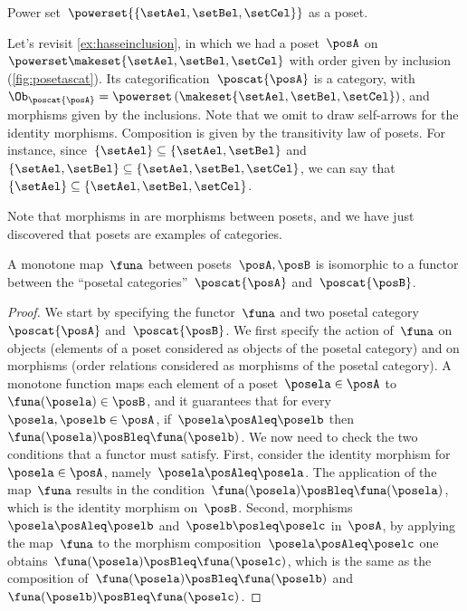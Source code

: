 \begin{marginfigure}
	\centering
	\caption{Power set~$\powerset{\{\setAel,\setBel,\setCel\}}$ as a poset. \label{fig:posetascat}}
\end{marginfigure}

\begin{example}
	Let's revisit \cref{ex:hasseinclusion}, in which we had a poset~$\posA$ on $\powerset \makeset{\setAel,\setBel,\setCel}$ with order given by inclusion (\cref{fig:posetascat}).
	Its categorification~$\poscat{\posA}$ is a category, with $\Ob_{\poscat{\posA}}=\powerset\left(\makeset{\setAel,\setBel,\setCel}\right)$, and morphisms given by the inclusions.
	Note that we omit to draw self-arrows for the identity morphisms.
	Composition is given by the transitivity law of posets.
	For instance, since~$\{\setAel\}\subseteq \{\setAel,\setBel\}$ and~$\{\setAel,\setBel\} \subseteq \{\setAel,\setBel,\setCel\}$, we can say that~$\{\setAel\}\subseteq \{\setAel,\setBel,\setCel\}$.
\end{example}



Note that morphisms in \Pos are morphisms between posets, and we have just discovered that posets are examples of categories.
\begin{lemma}
	\label{lem:posetfunctor}
	A monotone map~$\funa$ between posets~$\posA,\posB$ is isomorphic to a functor between the ``posetal categories''~$\poscat{\posA}$ and~$\poscat{\posB}$.
\end{lemma}
\begin{proof}
	We start by specifying the functor~$\funa$ and two posetal category~$\poscat{\posA}$ and~$\poscat{\posB}$.
	We first specify the action of~$\funa$ on objects (elements of a poset considered as objects of the posetal category) and on morphisms (order relations considered as morphisms of the posetal category).
	A monotone function maps each element of a poset~$\posela\in \posA$ to~$\funa(\posela) \in \posB$, and it guarantees that for every~$\posela,\poselb\in \posA$, if~$\posela\posAleq \poselb$ then~$\funa(\posela)\posBleq \funa(\poselb)$.
	We now need to check the two conditions that a functor must satisfy.
	First, consider the identity morphism for~$\posela\in \posA$, namely~$\posela \posAleq \posela$.
	The application of the map~$\funa$ results in the condition~$\funa(\posela)\posBleq \funa(\posela)$, which is the identity morphism on~$\posB$.
	Second, morphisms~$\posela\posAleq \poselb$ and~$\poselb\posleq \poselc$ in~$\posA$, by applying the map~$\funa$ to the morphism composition~$\posela\posAleq \poselc$ one obtains~$\funa(\posela)\posBleq \funa(\poselc)$, which is the same as the composition of~$\funa(\posela)\posBleq \funa(\poselb)$ and~$\funa(\poselb)\posBleq \funa(\poselc)$.
\end{proof}

